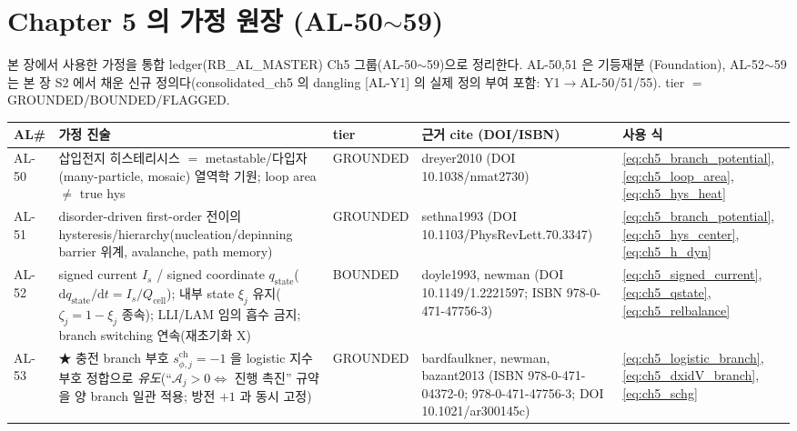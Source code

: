 \documentclass[11pt,a4paper]{article}
\newcommand{\dd}{\mathrm{d}}
\newcommand{\cell}{\mathrm{cell}}
\newcommand{\chg}{\mathrm{ch}}
\newcommand{\stt}{\mathrm{state}}
\newcommand{\AL}[1]{\textsf{[AL-#1]}}
\newcommand{\brk}{\discretionary{}{}{}}%
\begin{document}
\section{Chapter 5 의 가정 원장 (AL-50$\sim$59)}\label{sec:ch5_al}
본 장에서 사용한 가정을 통합 ledger(RB\_AL\_MASTER) Ch5 그룹(AL-50$\sim$59)으로 정리한다. AL-50,51 은 기등재분
(Foundation), AL-52$\sim$59 는 본 장 S2 에서 채운 신규 정의다(consolidated\_ch5 의 dangling \AL{Y1} 의 실제
정의 부여 포함: Y1$\to$AL-50/51/55). tier $=$ GROUNDED/BOUNDED/FLAGGED.
{\footnotesize
\setlength{\tabcolsep}{3pt}
\sloppy
\begin{longtable}{>{\raggedright\arraybackslash}p{} >{\raggedright\arraybackslash}p{} >{\raggedright\arraybackslash}p{} >{\raggedright\arraybackslash}p{} >{\raggedright\arraybackslash}p{}}
\toprule AL\# & 가정 진술 & tier & 근거 cite (DOI/ISBN) & 사용 식 \\ \midrule \endhead
AL-50 & 삽입전지 히스테리시스 $=$ metastable/다입자(many-particle, mosaic) 열역학 기원; loop area $\ne$ true hys & GROUNDED & dreyer2010 (DOI 10.1038/\brk nmat2730) & \eqref{eq:ch5_branch_potential},\allowbreak\eqref{eq:ch5_loop_area},\allowbreak\eqref{eq:ch5_hys_heat} \\
AL-51 & disorder-driven first-order 전이의 hysteresis/hierarchy(nucleation/depinning barrier 위계, avalanche, path memory) & GROUNDED & sethna1993 (DOI 10.1103/\brk PhysRevLett.70.3347) & \eqref{eq:ch5_branch_potential},\allowbreak\eqref{eq:ch5_hys_center},\allowbreak\eqref{eq:ch5_h_dyn} \\
AL-52 & signed current $I_s$ / signed coordinate $q_\stt$($\dd q_\stt/\dd t{=}I_s/Q_\cell$); 내부 state $\xi_j$ 유지($\zeta_j{=}1{-}\xi_j$ 종속); LLI/LAM 임의 흡수 금지; branch switching 연속(재초기화 X) & BOUNDED & doyle1993, newman (DOI 10.1149/\brk 1.2221597; ISBN 978-0-\brk 471-47756-3) & \eqref{eq:ch5_signed_current},\allowbreak\eqref{eq:ch5_qstate},\allowbreak\eqref{eq:ch5_relbalance} \\
AL-53 & ★ 충전 branch 부호 $s_{\phi,j}^\chg{=}-1$ 을 logistic 지수 부호 정합으로 \emph{유도}(``$\mathcal A_j{>}0\Leftrightarrow$ 진행 촉진'' 규약을 양 branch 일관 적용; 방전 $+1$ 과 동시 고정) & GROUNDED & bardfaulkner, newman, bazant2013 (ISBN 978-0-\brk 471-04372-0; 978-0-\brk 471-47756-3; DOI 10.1021/\brk ar300145c) & \eqref{eq:ch5_logistic_branch},\allowbreak\eqref{eq:ch5_dxidV_branch},\allowbreak\eqref{eq:ch5_schg} \\

\end{longtable}}
\end{document}
